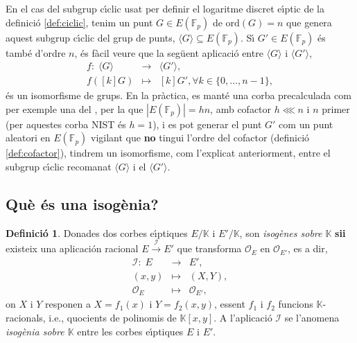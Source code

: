 \documentclass[12pt,twoside,catalan,a4paper]{book}%
\numberwithin{figure}{section}		%
\theoremstyle{definition}   			%
\newtheorem{defi}{Definici\'o}[chapter]%
\def\ces{corbes e\lgem{}\'{\i}ptiques}%
\def\sgc{subgrup c\'{\i}clic}%
\newcommand{\K}{\ensuremath{\mathbb{K}}}%
\newcommand{\Fp}{\ensuremath{\mathbb{F}_p}}%
\theoremstyle{saltolinea}   			%
\begin{document}
En el cas del \sgc{} usat per definir el logaritme discret e\lgem{}\'{\i}ptic de la definici\'o \ref{def:ciclic}, tenim un punt $G\in E(\Fp)$ de $\mathrm{ord}(G)=n$ que genera aquest \sgc{} del grup de punts, $\langle G\rangle\subseteq E(\Fp)$. S\'{\i} $G'\in E(\Fp)$ \'es tamb\'e d'ordre $n$, \'es f\`acil veure que la seg\"uent aplicaci\'o entre $\langle G\rangle$ i $\langle G'\rangle$,
$$\begin{array}{rcl}f:\; \langle G\rangle &\longrightarrow &\langle G'\rangle,\\ f([k]G) &\longmapsto & [k]G',\forall k\in\{0,\dots,n-1\},\end{array}$$
\'es un isomorfisme de grups. En la pr\`actica, es mant\'e una corba precalculada com per exemple una del \cite{NIST186}, per la que $|E(\Fp)|=hn$, amb cofactor $h\lll n$ i $n$ primer (per aquestes corba NIST \'es $h=1$), i es pot generar el punt $G'$ com un punt aleatori en $E(\Fp)$ vigilant que {\bf no} tingui l'ordre del cofactor (definici\'o \ref{def:cofactor}), tindrem un isomorfisme, com l'explicat anteriorment, entre el \sgc{} recomanat $\langle G\rangle$ i el $\langle G'\rangle$.

\subsection{Qu\`e \'es una isog\`enia?}\label{subsec:isogenia}

\begin{defi}\label{def:isogenia} Donades dos \ces{} $E/\K$ i $E'/\K$, son \emph{isog\`enes sobre $\K$} \textbf{sii} existeix una aplicaci\'on racional $E\xrightarrow{\mathcal{I}}E'$ que transforma $\mathcal{O}_{E}$ en $\mathcal{O}_{E'}$, es a dir,
\begin{equation}\label{eq:isogenia}\begin{array}{rcl}\mathcal{I}:\;E & \longrightarrow & E',\\ (x,y) & \longmapsto & (X,Y), \\ \mathcal{O}_{E} & \longmapsto  & \mathcal{O}_{E'},\end{array}\end{equation}
on $X$ i $Y$ responen a $X=f_{1}(x)$ i $Y=f_{2}(x,y)$, essent $f_{1}$ i $f_{2}$ funcions $\K$\/-racionals, i.e., quocients de polinomis de $\K[x,y]$. A l'aplicaci\'o $\mathcal{I}$ se l'anomena \emph{isog\`enia sobre $\K$} entre les \ces{} $E$ i $E'$.
\end{defi}
\end{document}
